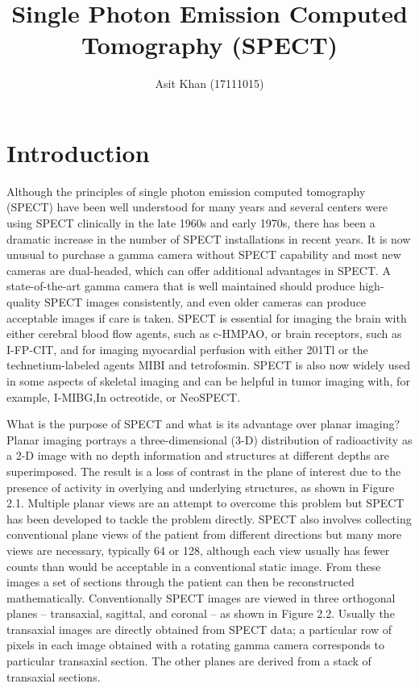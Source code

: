 \documentclass[12pt]{article}
\begin{document}
\title{Single Photon Emission Computed Tomography (SPECT)}
\author{Asit Khan (17111015)}
\maketitle


\section*{Introduction}
\large


Although the principles of single photon emission computed tomography (SPECT) have been well understood for many years and several centers were using SPECT clinically in the late 1960s and early 1970s, there has been a dramatic increase in the number of SPECT installations in recent years. It is now unusual to purchase a gamma camera without SPECT capability and most new cameras are dual-headed, which can offer additional advantages in SPECT. A state-of-the-art gamma camera that is well maintained should produce high-quality SPECT images consistently, and even older cameras can produce acceptable images if care is taken. SPECT is essential for imaging the brain with either cerebral blood flow agents, such as c-HMPAO, or brain receptors, such as I-FP-CIT, and for imaging myocardial perfusion with either 201Tl or the technetium-labeled agents MIBI and tetrofosmin. SPECT is also now widely used in some aspects of skeletal imaging and can be helpful in tumor imaging with, for example, I-MIBG,In octreotide, or NeoSPECT.
\par
What is the purpose of SPECT and what is its advantage over planar imaging? Planar imaging portrays a three-dimensional (3-D) distribution of radioactivity as a 2-D image with no depth information and structures at different depths are superimposed. The result is a loss of contrast in the plane of interest due to the presence of activity in overlying and underlying structures, as shown in Figure 2.1. Multiple planar views are an attempt to overcome this problem but SPECT has been developed to tackle the problem directly. SPECT also involves collecting conventional plane views of the patient from different directions but many more views are necessary, typically 64 or 128, although each view usually has fewer counts than would be acceptable in a conventional static image. From these images a set of sections through the patient can then be reconstructed mathematically. Conventionally SPECT images are viewed in three orthogonal planes – transaxial, sagittal, and coronal – as shown in Figure 2.2. Usually the transaxial images are directly obtained from SPECT data; a particular row of pixels in each image obtained with a rotating gamma camera corresponds to particular transaxial section. The other planes are derived from a stack of transaxial sections.
\par
\end{document}
